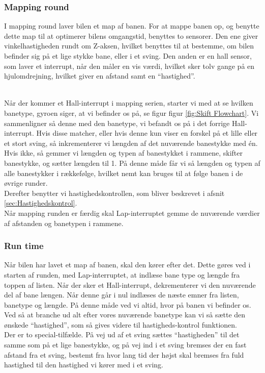 \subsubsection{Mapping round}
I mapping round laver bilen et map af banen. For at mappe banen op, og benytte dette map til at optimerer bilens omgangstid, benyttes to sensorer. Den ene giver vinkelhastigheden rundt om Z-aksen, hvilket benyttes til at bestemme, om bilen befinder sig på et lige stykke bane, eller i et sving. Den anden er en hall sensor, som laver et interrupt, når den måler en vis værdi, hvilket sker tolv gange på en hjulomdrejning, hvilket giver en afstand samt en ``hastighed''.
\\\


Når der kommer et Hall-interrupt i mapping serien, starter vi med at se hvilken banetype, gyroen siger, at vi befinder os på, se figur figur \ref{fig:Skift Flowchart}. Vi sammenligner så denne med den banetype, vi befandt os på i det forrige Hall-interrupt. Hvis disse matcher, eller hvis denne kun viser en forskel på et lille eller et stort sving, så inkrementerer vi længden af det nuværende banestykke med én. Hvis ikke, så gemmer vi længden og typen af banestykket i rammene, skifter banestykke, og sætter længden til 1. På denne måde får vi så længden og typen af alle banestykker i rækkefølge, hvilket nemt kan bruges til at følge banen i de øvrige runder.
\\
Derefter benytter vi hastighedskontrollen, som bliver beskrevet i afsnit \ref{sec:Hastighedskontrol}.
\\
Når mapping runden er færdig skal Lap-interruptet gemme de nuværende værdier af afstanden og banetypen i rammene. 

\subsubsection{Run time}

Når bilen har lavet et map af banen, skal den kører efter det. Dette gøres ved i starten af runden, med Lap-interruptet, at indlæse bane type og længde fra toppen af listen. Når der sker et Hall-interrupt, dekrementerer vi den nuværende del af bane længen. Når denne går i nul indlæses de næste emner fra listen, banetype og længde. På denne måde ved vi altid, hvor på banen vi befinder os.
\\
Ved så at branche ud alt efter vores nuværende banetype kan vi så sætte den ønskede ``hastighed'', som så gives videre til hastigheds-kontrol funktionen.
\\
Der er to special-tilfælde. På vej ud af et sving sættes ``hastigheden'' til det samme som på et lige banestykke, og på vej ind i et sving bremses der en fast afstand fra et sving, bestemt fra hvor lang tid der højst skal bremses fra fuld hastighed til den hastighed vi kører med i et sving.
